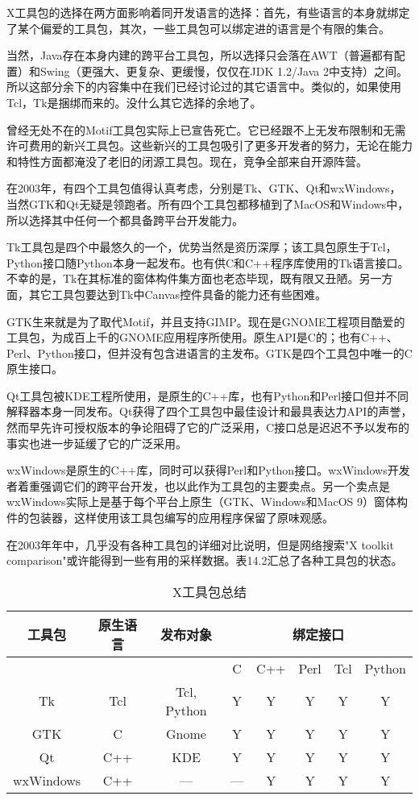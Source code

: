 \documentclass[12pt,oneside]{book}
\begin{document}
\begin{common-format}
X工具包的选择在两方面影响着同开发语言的选择：首先，有些语言的本身就绑定了某个偏爱的工具包，其次，一些工具包可以绑定进的语言是个有限的集合。

当然，Java存在本身内建的跨平台工具包，所以选择只会落在AWT（普遍都有配置）和Swing（更强大、更复杂、更缓慢，仅仅在JDK 1.2/Java 2中支持）之间。所以这部分余下的内容集中在我们已经讨论过的其它语言中。类似的，如果使用Tcl，Tk是捆绑而来的。没什么其它选择的余地了。

曾经无处不在的Motif工具包实际上已宣告死亡。它已经跟不上无发布限制和无需许可费用的新兴工具包。这些新兴的工具包吸引了更多开发者的努力，无论在能力和特性方面都淹没了老旧的闭源工具包。现在，竞争全部来自开源阵营。

在2003年，有四个工具包值得认真考虑，分别是Tk、GTK、Qt和wxWindows，  当然GTK和Qt无疑是领跑者。所有四个工具包都移植到了MacOS和Windows中，所以选择其中任何一个都具备跨平台开发能力。

Tk工具包是四个中最悠久的一个，优势当然是资历深厚；该工具包原生于Tcl，Python接口随Python本身一起发布。也有供C和C++程序库使用的Tk语言接口。不幸的是，Tk在其标准的窗体构件集方面也老态毕现，既有限又丑陋。另一方面，其它工具包要达到Tk中Canvas控件具备的能力还有些困难。

GTK生来就是为了取代Motif，并且支持GIMP。现在是GNOME工程项目酷爱的工具包，为成百上千的GNOME应用程序所使用。原生API是C的；也有C++、Perl、Python接口，但并没有包含进语言的主发布。GTK是四个工具包中唯一的C原生接口。

Qt工具包被KDE工程所使用，是原生的C++库，也有Python和Perl接口但并不同解释器本身一同发布。Qt获得了四个工具包中最佳设计和最具表达力API的声誉，然而早先许可授权版本的争论阻碍了它的广泛采用，C接口总是迟迟不予以发布的事实也进一步延缓了它的广泛采用。

wxWindows是原生的C++库，同时可以获得Perl和Python接口。wxWindows开发者着重强调它们的跨平台开发，也以此作为工具包的主要卖点。另一个卖点是wxWindows实际上是基于每个平台上原生（GTK、Windows和MacOS 9）窗体构件的包装器，这样使用该工具包编写的应用程序保留了原味观感。

在2003年年中，几乎没有各种工具包的详细对比说明，但是网络搜索"X toolkit comparison"或许能得到一些有用的采样数据。表14.2汇总了各种工具包的状态。

\begin{table}[H]
\centering
\caption{X工具包总结}
\label{tab:X工具包总结}
\medskip 
\begin{tabular}{@{}cccccccc@{}}
\toprule
工具包 & 原生语言 & 发布对象  & \multicolumn{5}{c}{绑定接口}  \\ \midrule
           &               &                &  C & C++ & Perl  & Tcl & Python \\
Tk & Tcl & Tcl, Python & Y & Y & Y & Y & Y \\
GTK & C & Gnome & Y & Y & Y & Y & Y\\
Qt & C++ & KDE & Y & Y & Y & Y & Y\\
wxWindows & C++ & — & — & Y & Y & Y &  Y
 \\ \bottomrule
\end{tabular}
\end{table}



\end{common-format}
\end{document}
